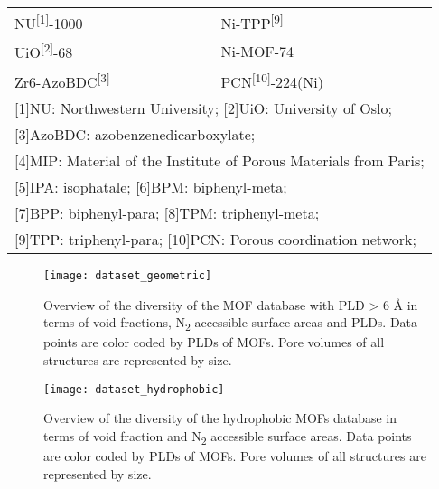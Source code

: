 \begin{table}[H]
\begin{tabular}{@{}llll@{}}
        NU\textsuperscript{{[}1{]}}-1000 & \citep{soaresComputationalEvaluationChemical2019} &
        Ni-TPP\textsuperscript{{[}9{]}} & \citep{zhengMolecularInsightFluorocarbon2020}\\
        UiO\textsuperscript{{[}2{]}}-68 & \citep{soaresComputationalEvaluationChemical2019} &
        Ni-MOF-74 & \citep{zhengMolecularInsightFluorocarbon2020}\\
        Zr6-AzoBDC\textsuperscript{{[}3{]}} & \citep{soaresComputationalEvaluationChemical2019} &
        PCN\textsuperscript{{[}10{]}}-224(Ni) & \citep{fengConstructionUltrastablePorphyrin2013}\\
        \bottomrule
        \multicolumn{4}{l}{{[}1{]}NU: Northwestern University; {[}2{]}UiO: University of Oslo;}\\
        \multicolumn{4}{l}{{[}3{]}AzoBDC: azobenzenedicarboxylate;}\\
        \multicolumn{4}{l}{{[}4{]}MIP: Material of the Institute of Porous Materials from Paris;}\\
        \multicolumn{4}{l}{{[}5{]}IPA: isophatale; {[}6{]}BPM: biphenyl-meta;}\\
        \multicolumn{4}{l}{{[}7{]}BPP: biphenyl-para; {[}8{]}TPM: triphenyl-meta;}\\
        \multicolumn{4}{l}{{[}9{]}TPP: triphenyl-para; {[}10{]}PCN: Porous coordination network;}\\
    \end{tabular}
\end{table}

\begin{figure}[H]
    \centering
    \texttt{[image: dataset\_geometric]}
    \caption{%
        Overview of the diversity of the MOF database with PLD > 6 Å in terms of
        void fractions, N\textsubscript{2} accessible surface areas and PLDs. Data
        points are color coded by PLDs of MOFs. Pore volumes of all structures are
        represented by size.
    }\label{fig:d4-screening-geometric}
\end{figure}

\begin{figure}[H]
    \centering
    \texttt{[image: dataset\_hydrophobic]}
    \caption{%
        Overview of the diversity of the hydrophobic MOFs database in terms of
        void fraction and N\textsubscript{2} accessible surface areas. Data
        points are color coded by PLDs of MOFs. Pore volumes of all structures
        are represented by size.
        }\label{fig:d4-screening-hydrophobic}
\end{figure}

